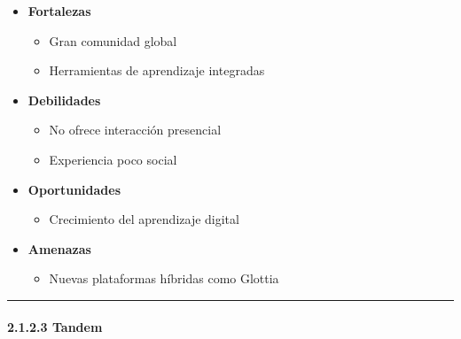 \begin{itemize}
\tightlist
\item
  \textbf{Fortalezas}

  \begin{itemize}
  \tightlist
  \item
    Gran comunidad global
  \item
    Herramientas de aprendizaje integradas
  \end{itemize}
\item
  \textbf{Debilidades}

  \begin{itemize}
  \tightlist
  \item
    No ofrece interacción presencial
  \item
    Experiencia poco social
  \end{itemize}
\item
  \textbf{Oportunidades}

  \begin{itemize}
  \tightlist
  \item
    Crecimiento del aprendizaje digital
  \end{itemize}
\item
  \textbf{Amenazas}

  \begin{itemize}
  \tightlist
  \item
    Nuevas plataformas híbridas como Glottia
  \end{itemize}
\end{itemize}

\begin{center}\rule{0.5\linewidth}{0.5pt}\end{center}

\paragraph{2.1.2.3
Tandem}\label{report__20-cap2-requirements-analysis.md__tandem}

